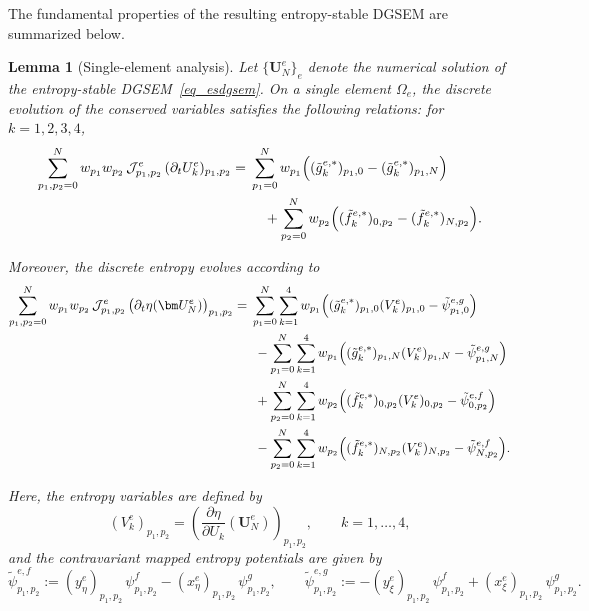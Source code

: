 \documentclass[fleqn,11pt]{amsart}
\newtheorem{lemma}[theorem]{Lemma}
\begin{document}
The fundamental properties of the resulting entropy-stable DGSEM are summarized below.
\begin{lemma}[Single-element analysis]
\label{lma:1}
Let $\{\bm U_N^e\}_e$ denote the numerical solution of the entropy-stable DGSEM~\eqref{eq_esdgsem}.  
On a single element $\Omega_e$, the discrete evolution of the conserved variables  satisfies the following relations:
for $k = 1,2,3,4$,
\begin{equation}
\label{eq_cc}
\begin{aligned}
\sum_{p_1,p_2=0}^N
w_{p_1} w_{p_2}\,
\mathcal{J}_{p_1,p_2}^e\,(\partial_t U_k^e)_{p_1,p_2}
= {} &
\sum_{p_1=0}^N w_{p_1}
\Bigl(
(\tilde g_k^{e,*})_{p_1,0}
-
(\tilde g_k^{e,*})_{p_1,N}
\Bigr) \\
&\quad +
\sum_{p_2=0}^N w_{p_2}
\Bigl(
(\tilde f_k^{e,*})_{0,p_2}
-
(\tilde f_k^{e,*})_{N,p_2}
\Bigr).
\end{aligned}
\end{equation}

Moreover, the discrete entropy evolves according to
\begin{equation}
\label{eq_ss}
\begin{aligned}
\sum_{p_1,p_2=0}^N
w_{p_1} w_{p_2}\,
\mathcal{J}_{p_1,p_2}^e\,
\bigl(\partial_t \eta(\bm U_N^e)\bigr)_{p_1,p_2}
= {} &
\sum_{p_1=0}^N \sum_{k=1}^4
w_{p_1}
\Bigl(
(\tilde g_k^{e,*})_{p_1,0} (V_k^e)_{p_1,0}
-
\tilde\psi^{e,g}_{p_1,0}
\Bigr) \\
&\; -
\sum_{p_1=0}^N \sum_{k=1}^4
w_{p_1}
\Bigl(
(\tilde g_k^{e,*})_{p_1,N} (V_k^e)_{p_1,N}
-
\tilde\psi^{e,g}_{p_1,N}
\Bigr) \\
&\; +
\sum_{p_2=0}^N \sum_{k=1}^4
w_{p_2}
\Bigl(
(\tilde f_k^{e,*})_{0,p_2} (V_k^e)_{0,p_2}
-
\tilde\psi^{e,f}_{0,p_2}
\Bigr) \\
&\; -
\sum_{p_2=0}^N \sum_{k=1}^4
w_{p_2}
\Bigl(
(\tilde f_k^{e,*})_{N,p_2} (V_k^e)_{N,p_2}
-
\tilde\psi^{e,f}_{N,p_2}
\Bigr).
\end{aligned}
\end{equation}

Here, the entropy variables are defined by
\[
(V_k^e)_{p_1,p_2}
=
\left(
\frac{\partial \eta}{\partial U_k}(\bm U_N^e)
\right)_{p_1,p_2},
\qquad k = 1,\dots,4,
\]
and the contravariant mapped entropy potentials are given by
\[
\tilde\psi^{e,f}_{p_1,p_2}
:=
(y_\eta^e)_{p_1,p_2}\,\psi^f_{p_1,p_2}
-
(x_\eta^e)_{p_1,p_2}\,\psi^g_{p_1,p_2},
\qquad
\tilde\psi^{e,g}_{p_1,p_2}
:=
-(y_\xi^e)_{p_1,p_2}\,\psi^f_{p_1,p_2}
+
(x_\xi^e)_{p_1,p_2}\,\psi^g_{p_1,p_2}.
\]
\end{lemma}
\end{document}
